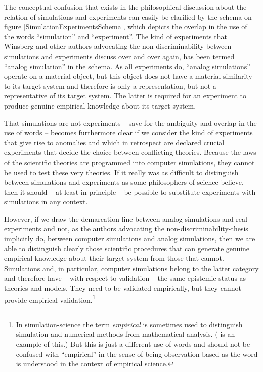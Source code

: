 \documentclass[12pt, a4paper]{article}
\begin{document}
The conceptual confusion that exists in the philosophical discussion
about the relation of simulations and experiments can easily be
clarified by the schema on figure \ref{SimulationExperimentsSchema},
which depicts the overlap in the use of the words ``simulation'' and
``experiment''. The kind of experiments that Winsberg and other
authors advocating the non-discriminability between simulations and
experiments discuss over and over again, has been termed ``analog
simulation'' in the schema. As all experiments do, ``analog
simulations'' operate on a material object, but this object does not
have a material similarity to its target system and therefore is only
a representation, but not a representative of its target system.  The
latter is required for an experiment to produce genuine empirical
knowledge about its target system.

That simulations are not experiments -- save for the ambiguity and
overlap in the use of words -- becomes furthermore clear if we
consider the kind of experiments that give rise to anomalies and which
in retrospect are declared crucial experiments that decide the choice
between conflicting theories. Because the laws of the scientific
theories are programmed into computer simulations, they cannot be used
to test these very theories. If it really was as difficult to
distinguish between simulations and experiments as some philosophers
of science believe, then it should -- at least in principle -- be
possible to substitute experiments with simulations in any context.

However, if we draw the demarcation-line between analog simulations
and real experiments and not, as the authors advocating the
non-discriminability-thesis implicitly do, between computer
simulations and analog simulations, then we are able to distinguish
clearly those scientific procedures that can generate genuine
empirical knowledge about their target system from those that cannot.
Simulations and, in particular, computer simulations belong to the
latter category and therefore have -- with respect to validation --
the same epistemic status as theories and models. They need to be
validated empirically, but they cannot provide empirical
validation.\footnote{In simulation-science the term {\em empirical} is
sometimes used to distinguish simulation and numerical methods from
mathematical analysis. (\citet{phelps:2016} is an example of this.)
But this is just a different use of words and should not be confused
with ``empirical'' in the sense of being observation-based as the word
is understood in the context of empirical science.}
\end{document}
